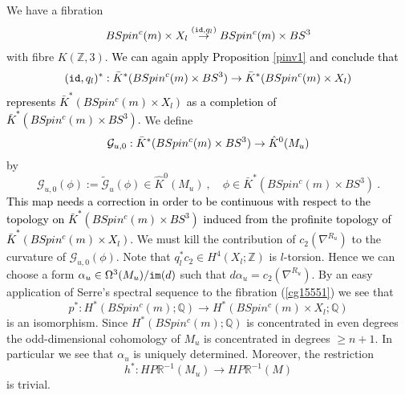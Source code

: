 \documentclass[12pt]{article}
\newcommand{\im}{{\tt im}}
\newcommand{\id}{{\tt id}}
\newcommand{\cG}{{\mathcal{G}}}
\newcommand{\Z}{{\mathbb{Z}}}
\newcommand{\Q}{{\mathbb{Q}}}
\newcommand{\R}{{\mathbb{R}}}
\begin{document}
 We have a fibration
\begin{equation}\label{cg15551}BSpin^{c}(m)\times  X_{l}\stackrel{(\id,q_{l})}{\to}BSpin^{c}(m)\times  BS^{3}\end{equation}
with fibre $K(\Z,3)$.
\textcolor{black}{We can again apply Proposition \ref{pinv1} 
 and conclude  that
\begin{equation}\label{cg1555}(\id,q_{l})^{*}:\bar K^{*}(BSpin^{c}(m)\times  BS^{3})\to \bar K^{*}(BSpin^{c}(m)\times X_{l})\end{equation}  represents $\bar K^{*}(BSpin^{c}(m)\times X_{l})$ as a completion of $\bar K^{*}(BSpin^{c}(m)\times  BS^{3})$.}
We define 
$$\cG_{u,0}:\textcolor{black}{\bar K^{*}(BSpin^{c}(m)\times  BS^{3})   }   \to \hat K^{0}(M_{u})$$
by
$$\cG_{u,0}( \phi):=\tilde \cG_{u}(\phi)\in \hat K^{0}(M_{u})\ , \quad \phi\in \bar K^{*}(BSpin^{c}(m)\times  BS^{3})\ .$$
\textcolor{black}{This  map  needs a correction in order to be continuous with respect to the topology on
$\bar K^{*}(BSpin^{c}(m)\times  BS^{3})$ induced from the profinite topology of $\bar K^{*}(BSpin^{c}(m)\times X_{l})$.}
We must kill the contribution of $c_{2}(\nabla^{R_{u}})$ to the curvature of $\cG_{u,0}( \phi)$.
Note that $q_{l}^{*}c_{2}\in H^{4}(X_{l};\Z)$ is $l$-torsion.  Hence
we can choose a form $\alpha_{u}\in \Omega^{3}(M_{u})/\im(d)$ such that $d\alpha_{u}=c_{2}(\nabla^{R_{u}})$.
By an easy application of Serre's spectral sequence to the fibration (\ref{cg15551}) we see that
$$p^{*}:H^{*}(BSpin^{c}(m);\Q)\to H^{*}(BSpin^{c}(m)\times X_{l};\Q)$$ is an isomorphism.
Since $H^{*}(BSpin^{c}(m);\Q)$ is concentrated in even degrees
the odd-dimensional cohomology of $M_{u}$ is concentrated in degrees $\ge n+1$.
In particular we see that $\alpha_{u}$ is uniquely determined.
Moreover, the restriction 
\begin{equation}\label{okt2801-2012}h^{*}:HP\R^{-1}(M_{u})\to HP\R^{-1}(M)\end{equation} is trivial.
\end{document}
